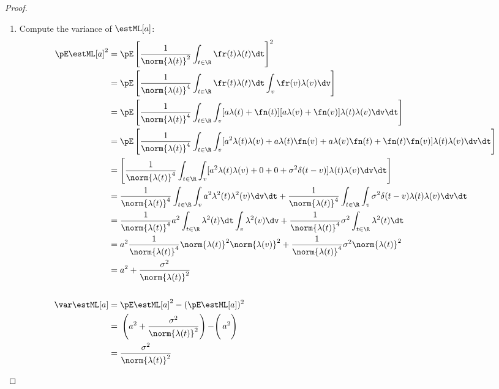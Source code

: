 \begin{proof}
\begin{enumerate}
\item Compute the variance of $\estML[a]$:
\begin{align*}
  \pE \estML[a]^2
    &= \pE \left[ \frac{1}{\norm{\lambda(t)}^2} \int_{t\in\R} \fr(t)\lambda(t) \dt\right]^2
  \\&= \pE \left[  \frac{1}{\norm{\lambda(t)}^4}
        \int_{t\in\R} \fr(t)\lambda(t) \dt \int_v \fr(v)\lambda(v) \dv
        \right]
  \\&= \pE \left[  \frac{1}{\norm{\lambda(t)}^4}
        \int_{t\in\R} \int_v [a\lambda(t) + \fn(t)][a\lambda(v) + \fn(v)]
        \lambda(t) \lambda(v)
        \dv\dt \right]
  \\&= \pE \left[  \frac{1}{\norm{\lambda(t)}^4}
        \int_{t\in\R} \int_v
        [a^2\lambda(t)\lambda(v) + a\lambda(t)\fn(v) + a\lambda(v)\fn(t) + \fn(t)\fn(v)]
        \lambda(t) \lambda(v)
        \dv\dt \right]
  \\&= \left[  \frac{1}{\norm{\lambda(t)}^4}
        \int_{t\in\R} \int_v
        [a^2\lambda(t)\lambda(v) + 0 + 0 + \sigma^2\delta(t-v)]
        \lambda(t) \lambda(v)
        \dv\dt \right]
  \\&= \frac{1}{\norm{\lambda(t)}^4}
        \int_{t\in\R} \int_v a^2\lambda^2(t)\lambda^2(v) \dv\dt +
        \frac{1}{\norm{\lambda(t)}^4}
        \int_{t\in\R} \int_v \sigma^2\delta(t-v) \lambda(t) \lambda(v) \dv\dt
  \\&= \frac{1}{\norm{\lambda(t)}^4}
        a^2 \int_{t\in\R} \lambda^2(t) \dt \int_v \lambda^2(v) \dv +
        \frac{1}{\norm{\lambda(t)}^4}
        \sigma^2\int_{t\in\R} \lambda^2(t) \dt
  \\&= a^2 \frac{1}{\norm{\lambda(t)}^4}
        \norm{\lambda(t)}^2 \norm{\lambda(v)}^2 +
        \frac{1}{\norm{\lambda(t)}^4}
        \sigma^2 \norm{\lambda(t)}^2
  \\&= a^2 + \frac{\sigma^2}{\norm{\lambda(t)}^2}
\\
\\
  \var\estML[a]
    &= \pE \estML[a]^2 - (\pE \estML[a])^2
  \\&= \left.\left.\left(a^2 + \frac{\sigma^2}{\norm{\lambda(t)}^2}\right) - \right( a^2 \right)
  \\&= \frac{\sigma^2}{\norm{\lambda(t)}^2}
\end{align*}


\end{enumerate}
\end{proof}
